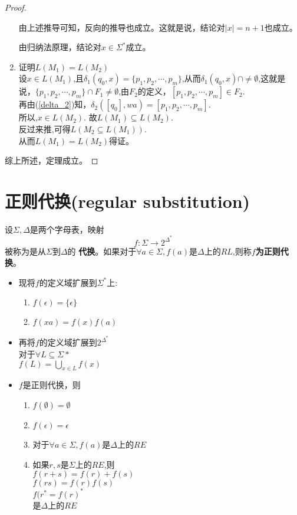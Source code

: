 \begin{proof}
\begin{enumerate}
		由上述推导可知，反向的推导也成立。这就是说，结论对$|x|=n+1$也成立。
		
		由归纳法原理，结论对$x\in\Sigma^\ast$成立。
		
		\item 证明$L(M_1)=L(M_2)$\\
		设$x\in L(M_1)$,且$\delta_1(q_0,x)=\{p_1,p_2,\cdots,p_m\}$,从而$\delta_1(q_0,x)\cap\ne\emptyset$,这就是说，$\{p_1,p_2,\cdots,p_m\}\cap F_1\ne\emptyset$,由$F_2$的定义，$[p_1,p_2,\cdots,p_m]\in F_2$.\\
		再由(\ref{delta_2})知，$\delta_2([q_0],wa)=[p_1,p_2,\cdots,p_m]$.\\
		所以,$x\in L(M_2)$. 故$L(M_1)\subseteq L(M_2)$.\\
		反过来推,可得$L(M_2\subseteq L(M_1))$.\\
		从而$L(M_1)=L(M_2)$得证。
	\end{enumerate}
	综上所述，定理成立。\hfill\square
\end{proof}

\section{正则代换(regular substitution)}

设$\Sigma,\Delta$是两个字母表，映射
$$f:\Sigma \to 2^{\Delta^{\ast}}$$
被称为是从$\Sigma$到$\Delta$的
\textbf{代换}。如果对于$\forall a\in \Sigma,f(a)$是$\Delta$上的$RL$,则称\textbf{$f$为正则代换}。

\begin{itemize}
	\item 现将$f$的定义域扩展到$\Sigma^{\ast}$上:
	\begin{enumerate}
		\item $f(\epsilon) =\{\epsilon\}$
		\item $f(xa)=f(x)f(a)$
	\end{enumerate}
    \item 再将$f$的定义域扩展到$2^{\Delta^{\ast}}$\\
    对于$\forall L\subseteq \Sigma{\ast}$\\
    $f(L) = \bigcup\limits_{x\in L} f(x)$
    \item $f$是正则代换，则
    \begin{enumerate}
    	\item $f(\emptyset)=\emptyset$
    	\item $f(\epsilon)=\epsilon$
    	\item 对于$\forall a\in \Sigma,f(a)$是$\Delta$上的$RE$
    	\item 如果$r,s$是$\Sigma$上的$RE$,则\\
    	$f(r+s)=f(r)+f(s)$\\
    	$f(rs)=f(r)f(s)$\\
    	$f(r^{\ast}={f(r)}^{\ast}$\\
    	是$\Delta$上的$RE$
    \end{enumerate}
\end{itemize}

